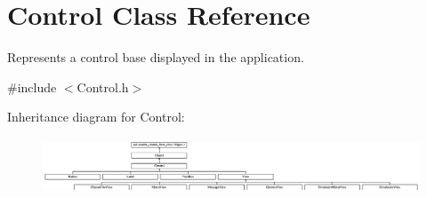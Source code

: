 \hypertarget{class_control}{}\section{Control Class Reference}
\label{class_control}


Represents a control base displayed in the application.  




{\ttfamily \#include $<$Control.\+h$>$}

Inheritance diagram for Control\+:\begin{figure}[H]
\begin{center}
\leavevmode
\includegraphics[height=1.632653cm]{class_control}
\end{center}
\end{figure}
